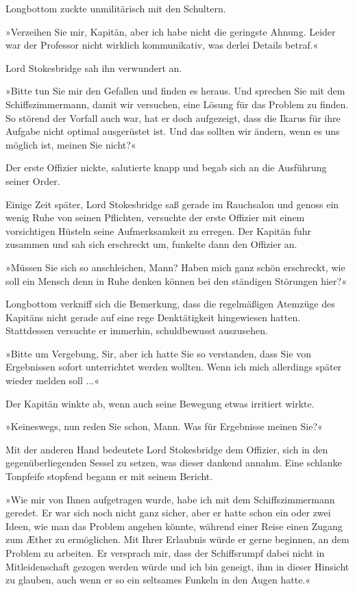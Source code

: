 Longbottom zuckte unmilitärisch mit den Schultern.

»Verzeihen Sie mir, Kapitän, aber ich habe nicht die geringste
Ahnung. Leider war der Professor nicht wirklich kommunikativ, was
derlei Details betraf.«

Lord Stokesbridge sah ihn verwundert an.

»Bitte tun Sie mir den Gefallen und finden es heraus. Und sprechen
Sie mit dem Schiffszimmermann, damit wir versuchen, eine Lösung für
das Problem zu finden. So störend der Vorfall auch war, hat er doch
aufgezeigt, dass die Ikarus für ihre Aufgabe nicht optimal
ausgerüstet ist. Und das sollten wir ändern, wenn es uns möglich
ist, meinen Sie nicht?«

Der erste Offizier nickte, salutierte knapp und begab sich an die
Ausführung seiner Order.

\tb

Einige Zeit später, Lord Stokesbridge saß gerade im Rauchsalon und
genoss ein wenig Ruhe von seinen Pflichten, versuchte der erste
Offizier mit einem vorsichtigen Hüsteln seine Aufmerksamkeit zu
erregen. Der Kapitän fuhr zusammen und sah sich erschreckt um,
funkelte dann den Offizier an.

»Müssen Sie sich so anschleichen, Mann? Haben mich ganz schön
erschreckt, wie soll ein Mensch denn in Ruhe denken können bei den
ständigen Störungen hier?«

Longbottom verkniff sich die Bemerkung, dass die regelmäßigen
Atemzüge des Kapitäns nicht gerade auf eine rege Denktätigkeit
hingewiesen hatten. Stattdessen versuchte er immerhin,
schuldbewusst auszusehen.

»Bitte um Vergebung, Sir, aber ich hatte Sie so verstanden, dass
Sie von Ergebnissen sofort unterrichtet werden wollten. Wenn ich
mich allerdings später wieder melden soll ...«

Der Kapitän winkte ab, wenn auch seine Bewegung etwas irritiert
wirkte.

»Keineswegs, nun reden Sie schon, Mann. Was für Ergebnisse meinen
Sie?«

Mit der anderen Hand bedeutete Lord Stokesbridge dem Offizier, sich
in den gegenüberliegenden Sessel zu setzen, was dieser dankend
annahm. Eine schlanke Tonpfeife stopfend begann er mit seinem
Bericht.

»Wie mir von Ihnen aufgetragen wurde, habe ich mit dem
Schiffszimmermann geredet. Er war sich noch nicht ganz sicher, aber
er hatte schon ein oder zwei Ideen, wie man das Problem angehen
könnte, während einer Reise einen Zugang zum Æther zu ermöglichen.
Mit Ihrer Erlaubnis würde er gerne beginnen, an dem Problem zu
arbeiten. Er versprach mir, dass der Schiffsrumpf dabei nicht in
Mitleidenschaft gezogen werden würde und ich bin geneigt, ihm in
dieser Hinsicht zu glauben, auch wenn er so ein seltsames Funkeln
in den Augen hatte.«

